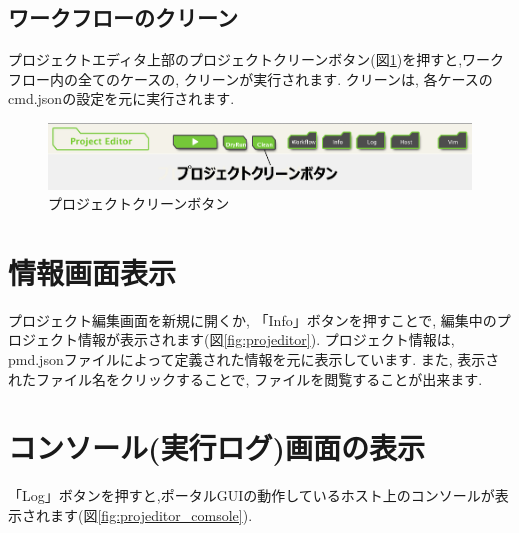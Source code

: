 \documentclass[a4paper,10pt,oneside]{jsbook}
\begin{document}
\subsection{ワークフローのクリーン}
プロジェクトエディタ上部のプロジェクトクリーンボタン(図\ref{fig:clean_project_button})を押すと,ワークフロー内の全てのケースの, クリーンが実行されます. 
クリーンは, 各ケースのcmd.jsonの設定を元に実行されます.

\begin{figure}[H]
	\begin{center}
		\includegraphics[width=12.0cm]{image/clean_project_button.png}
	\end{center}
	\caption{プロジェクトクリーンボタン}
	\label{fig:clean_project_button}
\end{figure}


\section{情報画面表示}
プロジェクト編集画面を新規に開くか, 「Info」ボタンを押すことで, 編集中のプロジェクト情報が表示されます(図\ref{fig:projeditor}). 
プロジェクト情報は, pmd.jsonファイルによって定義された情報を元に表示しています.
また, 表示されたファイル名をクリックすることで, ファイルを閲覧することが出来ます.
\newpage

\section{コンソール(実行ログ)画面の表示}
「Log」ボタンを押すと,ポータルGUIの動作しているホスト上のコンソールが表示されます(図\ref{fig:projeditor_comsole}).
\end{document}

